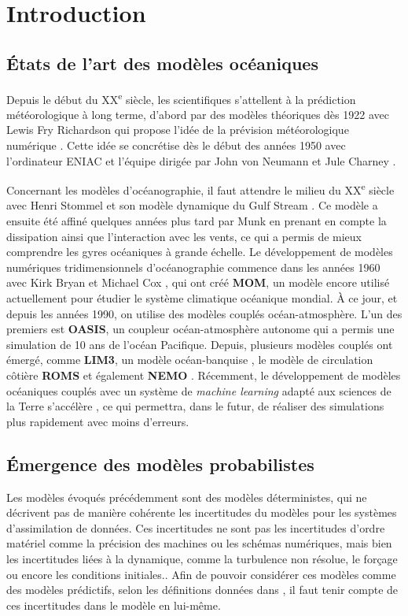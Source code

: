 \chapter{Introduction}

\section{États de l'art des modèles océaniques}
Depuis le début du XX\textsuperscript{e} siècle, les scientifiques s'attellent à la prédiction météorologique à long terme, d'abord par des modèles théoriques dès 1922 avec Lewis Fry Richardson qui propose l'idée de la prévision météorologique numérique \cite{richardson_weather_1922}. Cette idée se concrétise dès le début des années 1950 avec l'ordinateur ENIAC et l'équipe dirigée par John von Neumann et Jule Charney \cite{charney_numerical_1950}. 

Concernant les modèles d'océanographie, il faut attendre le milieu du XX\textsuperscript{e} siècle avec Henri Stommel et son modèle dynamique du Gulf Stream \cite{stommel_westward_1948}. Ce modèle a ensuite été affiné quelques années plus tard par Munk \cite{munk_wind-driven_1950} en prenant en compte la dissipation ainsi que l'interaction avec les vents, ce qui a permis de mieux comprendre les gyres océaniques à grande échelle. Le développement de modèles numériques tridimensionnels d'océanographie commence dans les années 1960 avec Kirk Bryan et Michael Cox \cite{bryan_nonlinear_1968, bryan_nonlinear_1968-1}, qui ont créé \textbf{MOM}, un modèle encore utilisé actuellement pour étudier le système climatique océanique mondial. À ce jour, et depuis les années 1990, on utilise des modèles couplés océan-atmosphère. L'un des premiers est \textbf{OASIS}, un coupleur océan-atmosphère autonome \cite{terray_oasis_1995} qui a permis une simulation de 10 ans de l'océan Pacifique. Depuis, plusieurs modèles couplés ont émergé, comme \textbf{LIM3}, un modèle océan-banquise \cite{vancoppenolle_lim3_2008}, le modèle de circulation côtière \textbf{ROMS} \cite{moore_regional_2011} et également \textbf{NEMO} \cite{madec_ocean_1997}. Récemment, le développement de modèles océaniques couplés avec un système de \textit{machine learning} adapté aux sciences de la Terre s'accélère \cite{wang_coupled_2024}, ce qui permettra, dans le futur, de réaliser des simulations plus rapidement avec moins d'erreurs.

\section{Émergence des modèles probabilistes}
Les modèles évoqués précédemment sont des modèles déterministes, qui ne décrivent pas de manière cohérente les incertitudes du modèles pour les systèmes d'assimilation de données. Ces incertitudes ne sont pas les incertitudes d'ordre matériel comme la précision des machines ou les schémas numériques, mais bien les incertitudes liées à la dynamique, comme la turbulence non résolue, le forçage ou encore les conditions initiales.. Afin de pouvoir considérer ces modèles comme des modèles prédictifs, selon les définitions données dans \cite{brier_verification_1950, toth_7_2003}, il faut tenir compte de ces incertitudes dans le modèle en lui-même.

